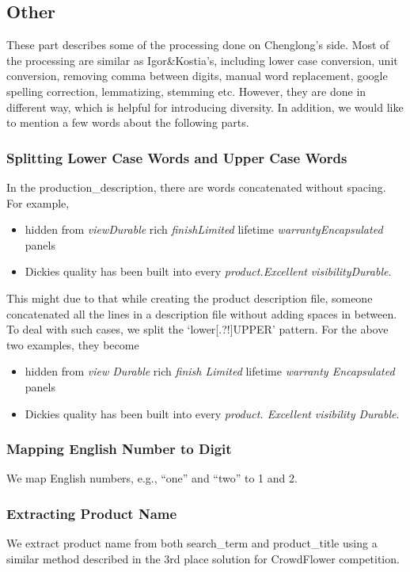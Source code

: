 \documentclass[12pt]{article}
\begin{document}
\subsection{Other}
These part describes some of the processing done on Chenglong's side. Most of the processing are similar as Igor\&Kostia's, including lower case conversion, unit conversion, removing comma between digits, manual word replacement, google spelling correction, lemmatizing, stemming etc. However, they are done in different way, which is helpful for introducing diversity. In addition, we would like to mention a few words about the following parts.
\subsubsection{Splitting Lower Case Words and Upper Case Words}
In the production\_description, there are words concatenated without spacing. For example,
\begin{itemize}
\item hidden from \emph{viewDurable} rich \emph{finishLimited} lifetime \emph{warrantyEncapsulated} panels
\item Dickies quality has been built into every \emph{product.Excellent} \emph{visibilityDurable}.
\end{itemize}
This might due to that while creating the product description file, someone concatenated all the lines in a description file without adding spaces in between. To deal with such cases, we split the `lower[.?!]UPPER' pattern. For the above two examples, they become
\begin{itemize}
\item hidden from \emph{view Durable} rich \emph{finish Limited} lifetime \emph{warranty Encapsulated} panels
\item Dickies quality has been built into every \emph{product. Excellent} \emph{visibility Durable}.
\end{itemize}

\subsubsection{Mapping English Number to Digit}
We map English numbers, e.g., ``one'' and ``two'' to 1 and 2.

\subsubsection{Extracting Product Name}
We extract product name from both search\_term and product\_title using a similar method described in the 3rd place solution for CrowdFlower competition\cite{crowdflower_3place}.
\end{document}
